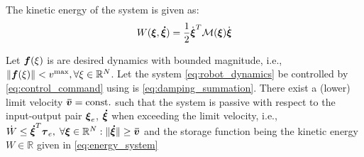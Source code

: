 The kinetic energy of the system is given as:
\begin{equation}
	W(\vecs \xi, \vecs{\dot \xi}) = \frac{1}{2}  \dot{\vecs{\xi}}^T \matd{M}(\vecs \xi) \dot{\vecs{\xi}} \label{eq:energy_system}
\end{equation}

\begin{theorem} \label{theorem:passivity}
  Let $\boldsymbol{f}(\xi)$ is are desired dynamics with bounded magnitude, i.e., $\| \boldsymbol{f}(\xi) \| < v^{\mathrm{max}}, \forall \xi \in \mathbb{R}^N$.
  Let the system \eqref{eq:robot_dynamics} be controlled by \eqref{eq:control_command} using is \eqref{eq:damping_summation}.
  There exist a (lower) limit velocity $\boldsymbol{\bar v} = \text{const.}$ such that the system is passive with respect to the input-output pair $\boldsymbol{\xi}_e$, $\boldsymbol{\dot \xi}$ when exceeding the limit velocity, i.e., $\dot{W} \leq \boldsymbol{\dot \xi}^T \boldsymbol{\tau}_e, \; \forall \boldsymbol{\xi} \in \mathbb{R}^N: \| \boldsymbol{\dot \xi} \| \geq \boldsymbol{\bar v}$ and the storage function being the kinetic energy $W \in \mathbb{R}$ given in \eqref{eq:energy_system}
\end{theorem}
  
